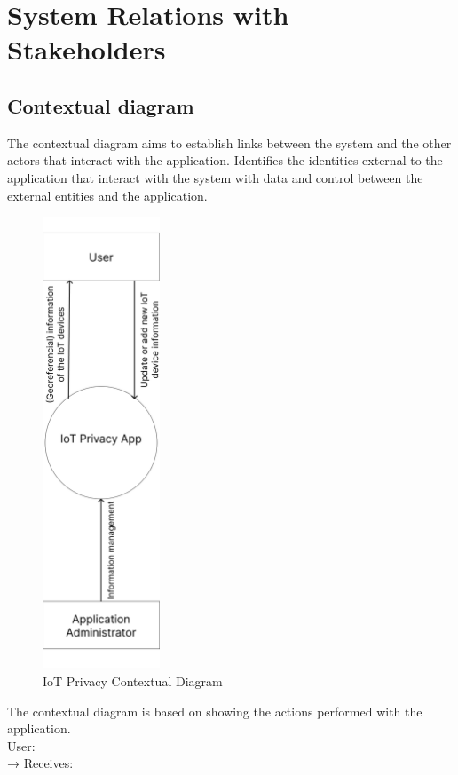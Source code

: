 \documentclass{scrreprt}
\begin{document}
\chapter{System Relations with Stakeholders}

\section{Contextual diagram}

The contextual diagram aims to establish links between the system
and the other actors that interact with the application.
\newline
Identifies the identities external to the application that interact with
the system with data and control between the external entities and the application.
\begin{figure}[H]
    \centering
    \includegraphics[width=3.5cm]{assets/images/contextual_diagram.png}
    \caption{IoT Privacy Contextual Diagram}
    \label{fig:contextual diagram}
\end{figure}
The contextual diagram is based on showing the actions performed with the
application. \\
\newline
User: \\
\newline
→ Receives:
\end{document}
